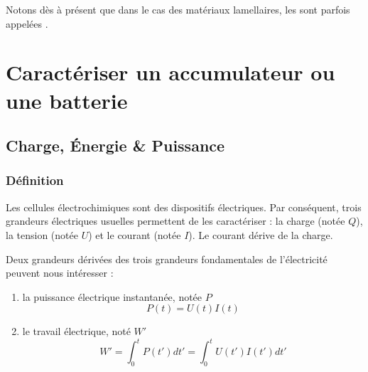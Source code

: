 Notons dès à présent que dans le cas des matériaux lamellaires, les   sont parfois appelées .



\section{Caractériser un accumulateur ou une batterie}

\subsection{Charge, \'{E}nergie \& Puissance}
\subsubsection{Définition}
Les cellules électrochimiques sont des dispositifs électriques. Par conséquent, trois grandeurs électriques usuelles permettent de les caractériser : la charge (notée $Q$), la tension (notée $U$) et le courant (notée $I$). Le courant dérive de la charge.

Deux grandeurs dérivées des trois grandeurs fondamentales de l'électricité peuvent nous intéresser :

\begin{enumerate}
    \item la puissance électrique instantanée, notée $P$
    \begin{equation}
        P(t) = U(t) I(t)
        \label{eq:puissance}
    \end{equation}
    \item le travail électrique, noté $W'$
    \begin{equation}
        W' = \int_0^t P(t') dt' = \int_0^t U(t') I(t') dt'
        \label{eq:travail}
    \end{equation}
\end{enumerate}

